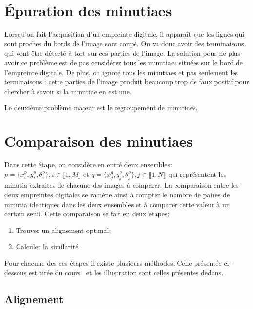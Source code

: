\documentclass{report}
\begin{document}
\section{Épuration des minutiaes}

Lorsqu'on fait l'acquisition d'un empreinte digitale, il apparaît que
les lignes qui sont proches du bords de l'image sont coupé. On va donc
avoir des terminaisons qui vont être détecté à tort sur ces parties de
l'image. La solution pour ne plus avoir ce problème est de pas
considérer tous les minutiaes situées sur le bord de l'empreinte
digitale. De plus, on ignore tous les minutiaes et pas seulement les
terminaisons : cette parties de l'image produit beaucoup trop de faux
positif pour chercher à savoir si la minutiae en est une.

Le deuxième problème majeur est le regroupement de minutiaes.



\section{Comparaison des minutiaes}

Dans cette étape, on considère en entré deux ensembles: $p =
\{x_{i}^{p}, y_{i}^{p}, \theta_{i}^{p}\}, i \in \llbracket 1, M
\rrbracket$ et $q = \{x_{j}^{q}, y_{j}^{q}, \theta_{j}^{q}\}, j \in
\llbracket 1, N \rrbracket$ qui représentent les minutia extraites de
chacune des images à comparer. La comparaison entre les deux
empreintes digitales se ramène ainsi à compter le nombre de paires de
minutia identiques dans les deux ensembles et à comparer cette valeur
à un certain seuil. Cette comparaison se fait en deux étapes:

\begin{enumerate}
\item Trouver un alignement optimal;
\item Calculer la similarité.
\end{enumerate}

Pour chacune des ces étapes il existe plusieurs méthodes. Celle
présentée ci-dessous est tirée du cours~\cite{finger.00.jain} et les
illustration sont celles présentes dedans.

\subsection{Alignement}
\end{document}
